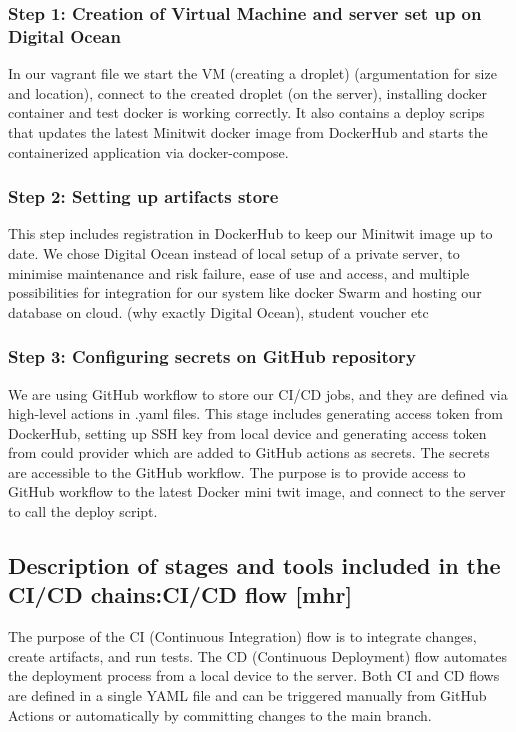 \documentclass{article}
\begin{document}
\subsubsection{Step 1: Creation of Virtual Machine and server set up on Digital Ocean}
In our vagrant file we start the VM (creating a droplet) (argumentation for size and location), connect to the created droplet (on the server), installing docker container and test docker is working correctly. It also contains a deploy scrips that updates the latest Minitwit docker image from DockerHub and starts the containerized application via docker-compose.

\subsubsection{Step 2: Setting up artifacts store}
This step includes registration in DockerHub to keep our Minitwit image up to date. We chose Digital Ocean instead of local setup of a private server, to minimise maintenance and risk failure, ease of use and access, and multiple possibilities for integration for our system like docker Swarm and hosting our database on cloud. (why exactly Digital Ocean), student voucher etc

\subsubsection{Step 3: Configuring secrets on GitHub repository}
We are using GitHub workflow to store our CI/CD jobs, and they are defined via high-level actions in .yaml files. This stage includes generating access token from DockerHub, setting up SSH key from local device and generating access token from could provider which are added to GitHub actions as secrets. The secrets are accessible to the GitHub workflow. The purpose is to provide access to GitHub workflow to the latest Docker mini twit image, and connect to the server to call the deploy script.

\subsection{Description of stages and tools included in the CI/CD chains:CI/CD flow [mhr]}
The purpose of the CI (Continuous Integration) flow is to integrate changes, create artifacts, and run tests. The CD (Continuous Deployment) flow automates the deployment process from a local device to the server. Both CI and CD flows are defined in a single YAML file and can be triggered manually from GitHub Actions or automatically by committing changes to the main branch.  
\end{document}
